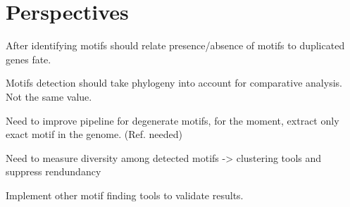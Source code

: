 \section*{Perspectives}

After identifying motifs should relate presence/absence of motifs to duplicated genes fate.

Motifs detection should take phylogeny into account for comparative analysis. Not the same value.

Need to improve pipeline for degenerate motifs, for the moment, extract only exact motif in the genome. (Ref. needed)

Need to measure diversity among detected motifs -> clustering tools and suppress rendundancy

Implement other motif finding tools to validate results.

